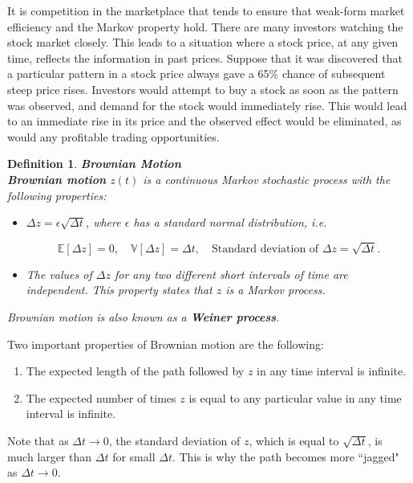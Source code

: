 \documentclass[letterpaper,10pt]{article}
\newtheorem{df}{Definition}[section]
\begin{document}
It is competition in the marketplace that tends to ensure that weak-form market efficiency and the Markov property hold. There are many investors watching the stock market closely. This leads to a situation where a stock price, at any given time, reflects the information in past prices. Suppose that it was discovered that a particular pattern in a stock price always gave a 65\% chance of subsequent steep price rises. Investors would attempt to buy a stock as soon as the pattern was observed, and demand for the stock would immediately rise. This would lead to an immediate rise in its price and the observed effect would be eliminated, as would any profitable trading opportunities.

\begin{df}{\bf Brownian Motion}\\
{\bf Brownian motion} $z(t)$ is a continuous Markov stochastic process with the following properties:
\begin{itemize}
\item $\displaystyle\Delta z=\epsilon\sqrt{\Delta t}$, where $\epsilon$ has a standard normal distribution, i.e.

$$\mathbb{E}[\Delta z]=0,\quad \mathbb{V}[\Delta z]=\Delta t,\quad \text{Standard deviation of }\Delta z=\sqrt{\Delta t}.$$

\item The values of $\Delta z$ for any two different short intervals of time are independent.  This property states that $z$ is a Markov process.
\end{itemize}
Brownian motion is also known as a {\bf Weiner process}.
\end{df}

\noindent Two important properties of Brownian motion are the following:

\begin{enumerate}

\item The expected length of the path followed by $z$ in any time interval is infinite.

\item The expected number of times $z$ is equal to any particular value in any time interval is infinite.

\end{enumerate}

\noindent Note that as $\Delta t\rightarrow 0$, the standard deviation of $z$, which is equal to $\displaystyle\sqrt{\Delta t}$, is much larger than $\Delta t$ for small $\Delta t$.  This is why the path becomes more ``jagged" as $\Delta t\rightarrow 0$.
\end{document}
